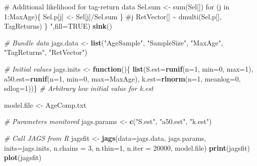 \documentclass[
]{krantz}
\makeatletter
\newenvironment{Shaded}{\begin{snugshade}}{\end{snugshade}}
\newcommand{\AttributeTok}[1]{\textcolor[rgb]{0.27,0.27,0.27}{#1}}
\newcommand{\CommentTok}[1]{\textcolor[rgb]{0.37,0.37,0.37}{\textit{#1}}}
\newcommand{\ConstantTok}[1]{\textcolor[rgb]{0.37,0.37,0.37}{#1}}
\newcommand{\ControlFlowTok}[1]{\textcolor[rgb]{0.27,0.27,0.27}{\textbf{#1}}}
\newcommand{\DecValTok}[1]{\textcolor[rgb]{0.06,0.06,0.06}{#1}}
\newcommand{\FunctionTok}[1]{\textcolor[rgb]{0.27,0.27,0.27}{\textbf{#1}}}
\newcommand{\NormalTok}[1]{#1}
\newcommand{\OtherTok}[1]{\textcolor[rgb]{0.37,0.37,0.37}{#1}}
\newcommand{\StringTok}[1]{\textcolor[rgb]{0.5,0.5,0.5}{#1}}
\newenvironment{kframe}{%
\medskip{}
\setlength{\fboxsep}{.8em}
 \def\at@end@of@kframe{}%
 \ifinner\ifhmode%
  \def\at@end@of@kframe{\end{minipage}}%
  \begin{minipage}{\columnwidth}%
 \fi\fi%
 \def\FrameCommand##1{\hskip\@totalleftmargin \hskip-\fboxsep
 \colorbox{shadecolor}{##1}\hskip-\fboxsep
     \hskip-\linewidth \hskip-\@totalleftmargin \hskip\columnwidth}%
 \MakeFramed {\advance\hsize-\width
   \@totalleftmargin\z@ \linewidth\hsize
   \@setminipage}}%
 {\par\unskip\endMakeFramed%
 \at@end@of@kframe}
\renewenvironment{Shaded}{\begin{kframe}}{\end{kframe}}
\makeatother
\begin{document}
\begin{Shaded}
\begin{Highlighting}[]
\StringTok{    \# Additional likelihood for tag{-}return data}
\StringTok{    Sel.sum \textless{}{-} sum(Sel[])}
\StringTok{    for (j in 1:MaxAge)\{}
\StringTok{    Sel.p[j] \textless{}{-} Sel[j]/Sel.sum}
\StringTok{    \} \#j}
\StringTok{    RetVector[] \textasciitilde{} dmulti(Sel.p[], TagReturns)    }
\StringTok{\}}
\StringTok{    "}\NormalTok{,}\AttributeTok{fill=}\ConstantTok{TRUE}\NormalTok{)}
\FunctionTok{sink}\NormalTok{()}

\CommentTok{\# Bundle data}
\NormalTok{jags.data }\OtherTok{\textless{}{-}} \FunctionTok{list}\NormalTok{(}\StringTok{"AgeSample"}\NormalTok{, }\StringTok{"SampleSize"}\NormalTok{, }\StringTok{"MaxAge"}\NormalTok{, }\StringTok{"TagReturns"}\NormalTok{, }\StringTok{"RetVector"}\NormalTok{)}

\CommentTok{\# Initial values}
\NormalTok{jags.inits }\OtherTok{\textless{}{-}} \ControlFlowTok{function}\NormalTok{()\{ }\FunctionTok{list}\NormalTok{(}\AttributeTok{S.est=}\FunctionTok{runif}\NormalTok{(}\AttributeTok{n=}\DecValTok{1}\NormalTok{, }\AttributeTok{min=}\DecValTok{0}\NormalTok{, }\AttributeTok{max=}\DecValTok{1}\NormalTok{),}
                               \AttributeTok{a50.est=}\FunctionTok{runif}\NormalTok{(}\AttributeTok{n=}\DecValTok{1}\NormalTok{, }\AttributeTok{min=}\DecValTok{0}\NormalTok{, }\AttributeTok{max=}\NormalTok{MaxAge),}
                               \AttributeTok{k.est=}\FunctionTok{rlnorm}\NormalTok{(}\AttributeTok{n=}\DecValTok{1}\NormalTok{, }\AttributeTok{meanlog=}\DecValTok{0}\NormalTok{, }\AttributeTok{sdlog=}\DecValTok{1}\NormalTok{))\} }
                            \CommentTok{\# Arbitrary low initial value for k.est}

\NormalTok{model.file }\OtherTok{\textless{}{-}} \StringTok{\textquotesingle{}AgeComp.txt\textquotesingle{}}

\CommentTok{\# Parameters monitored}
\NormalTok{jags.params }\OtherTok{\textless{}{-}} \FunctionTok{c}\NormalTok{(}\StringTok{"S.est"}\NormalTok{, }\StringTok{"a50.est"}\NormalTok{, }\StringTok{"k.est"}\NormalTok{)}

\CommentTok{\# Call JAGS from R}
\NormalTok{jagsfit }\OtherTok{\textless{}{-}} \FunctionTok{jags}\NormalTok{(}\AttributeTok{data=}\NormalTok{jags.data, jags.params, }\AttributeTok{inits=}\NormalTok{jags.inits,}
                \AttributeTok{n.chains =} \DecValTok{3}\NormalTok{, }\AttributeTok{n.thin=}\DecValTok{1}\NormalTok{, }\AttributeTok{n.iter =} \DecValTok{20000}\NormalTok{,}
\NormalTok{                model.file)}
\FunctionTok{print}\NormalTok{(jagsfit)}
\FunctionTok{plot}\NormalTok{(jagsfit)}
\end{Highlighting}
\end{Shaded}
\end{document}
